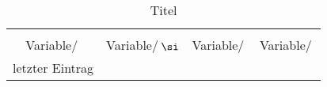 \begin{table}
	\centering
	\begin{tabular}{S[table-format=] S[table-format=] S[table-format=] S[table-format=]}
		\toprule
		 & \\
		{Variable/$\:\si{}$} & {Variable/$\:\si$} &{Variable$/\:\si{}$} & {Variable$/\:\si{}$}\\
		\midrule
			letzter Eintrag\\
		\bottomrule
	\end{tabular}
	\caption{Titel}
	\label{label}
\end{table}
